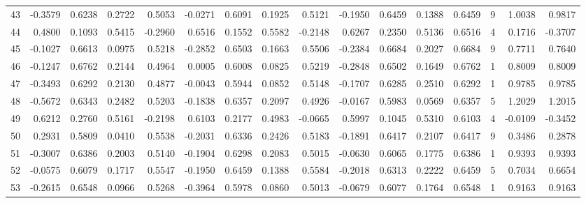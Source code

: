 \begin{tabular}{lrrrrrrrrrrrrrrr}
43  &     -0.3579 &  0.6238 &  0.2722 &  0.5053 & -0.0271 &  0.6091 &  0.1925 &  0.5121 & -0.1950 &  0.6459 &   0.1388 &     0.6459 &      9 &                    1.0038 &                     0.9817 \\
44  &      0.4800 &  0.1093 &  0.5415 & -0.2960 &  0.6516 &  0.1552 &  0.5582 & -0.2148 &  0.6267 &  0.2350 &   0.5136 &     0.6516 &      4 &                    0.1716 &                    -0.3707 \\
45  &     -0.1027 &  0.6613 &  0.0975 &  0.5218 & -0.2852 &  0.6503 &  0.1663 &  0.5506 & -0.2384 &  0.6684 &   0.2027 &     0.6684 &      9 &                    0.7711 &                     0.7640 \\
46  &     -0.1247 &  0.6762 &  0.2144 &  0.4964 &  0.0005 &  0.6008 &  0.0825 &  0.5219 & -0.2848 &  0.6502 &   0.1649 &     0.6762 &      1 &                    0.8009 &                     0.8009 \\
47  &     -0.3493 &  0.6292 &  0.2130 &  0.4877 & -0.0043 &  0.5944 &  0.0852 &  0.5148 & -0.1707 &  0.6285 &   0.2510 &     0.6292 &      1 &                    0.9785 &                     0.9785 \\
48  &     -0.5672 &  0.6343 &  0.2482 &  0.5203 & -0.1838 &  0.6357 &  0.2097 &  0.4926 & -0.0167 &  0.5983 &   0.0569 &     0.6357 &      5 &                    1.2029 &                     1.2015 \\
49  &      0.6212 &  0.2760 &  0.5161 & -0.2198 &  0.6103 &  0.2177 &  0.4983 & -0.0665 &  0.5997 &  0.1045 &   0.5310 &     0.6103 &      4 &                   -0.0109 &                    -0.3452 \\
50  &      0.2931 &  0.5809 &  0.0410 &  0.5538 & -0.2031 &  0.6336 &  0.2426 &  0.5183 & -0.1891 &  0.6417 &   0.2107 &     0.6417 &      9 &                    0.3486 &                     0.2878 \\
51  &     -0.3007 &  0.6386 &  0.2003 &  0.5140 & -0.1904 &  0.6298 &  0.2083 &  0.5015 & -0.0630 &  0.6065 &   0.1775 &     0.6386 &      1 &                    0.9393 &                     0.9393 \\
52  &     -0.0575 &  0.6079 &  0.1717 &  0.5547 & -0.1950 &  0.6459 &  0.1388 &  0.5584 & -0.2018 &  0.6313 &   0.2222 &     0.6459 &      5 &                    0.7034 &                     0.6654 \\
53  &     -0.2615 &  0.6548 &  0.0966 &  0.5268 & -0.3964 &  0.5978 &  0.0860 &  0.5013 & -0.0679 &  0.6077 &   0.1764 &     0.6548 &      1 &                    0.9163 &                     0.9163 \\

\end{tabular}
